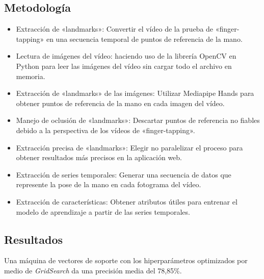 \subsection{Metodología}
\begin{itemize}


\item Extracción de «landmarks»: Convertir el vídeo de la prueba de «finger-tapping» en una secuencia temporal de puntos de referencia de la mano.

\item Lectura de imágenes del vídeo: haciendo uso de la librería OpenCV en Python para leer las imágenes del vídeo sin cargar todo el archivo en memoria.

\item Extracción de «landmarks» de las imágenes: Utilizar Mediapipe Hands para obtener puntos de referencia de la mano en cada imagen del vídeo.

\item Manejo de oclusión de «landmarks»: Descartar puntos de referencia no fiables debido a la perspectiva de los vídeos de «finger-tapping».

\item Extracción precisa de «landmarks»: Elegir no paralelizar el proceso para obtener resultados más precisos en la aplicación web.

\item Extracción de series temporales: Generar una secuencia de datos que represente la pose de la mano en cada fotograma del vídeo.

\item Extracción de características: Obtener atributos útiles para entrenar el modelo de aprendizaje a partir de las series temporales.


\end{itemize}
\subsection{Resultados}
Una máquina de vectores de soporte con los hiperparámetros optimizados por medio de \textit{GridSearch} da una precisión media del 78,85\%.

